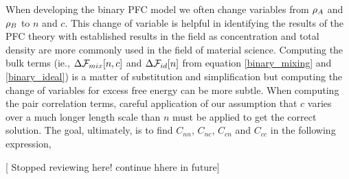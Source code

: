 When developing the binary PFC model we often change variables from $\rho_A$ and
$\rho_B$ to $n$ and $c$.  This change of variable is helpful in identifying the
results of the PFC theory with established results in the field as
concentration and total density are more commonly used in the field of material
science. Computing the bulk terms (ie., $\Delta\mathcal{F}_{mix}[n, c]$ and
$\Delta\mathcal{F}_{id}[n]$ from equation \ref{binary_mixing} and \ref{binary_ideal}) is
a matter of substitution and simplification but computing the change of variables for excess free
energy can be more subtle. When computing the pair correlation
terms, careful application of our assumption that $c$ varies over a much longer
length scale than $n$ must be applied to get the correct solution. The goal,
ultimately, is to find $C_{n n}$, $C_{n c}$, $C_{c n}$ and $C_{c c}$ in the
following expression, 

[{\color{ForestGreen} Stopped reviewing here! continue hhere in future}]

